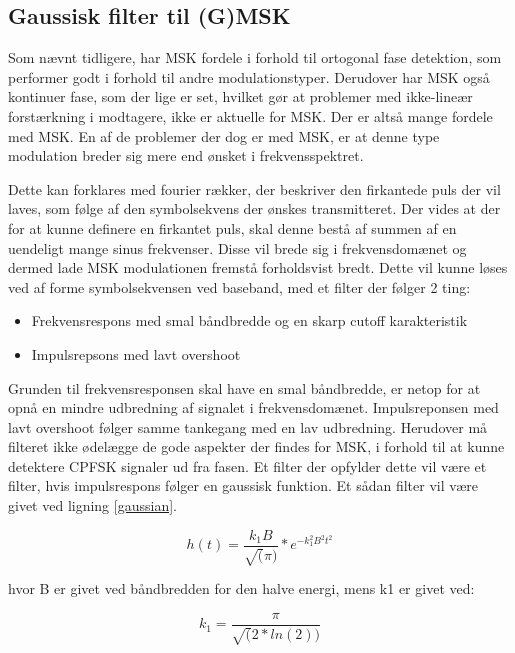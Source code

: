\begin{appendices}
\subsection{Gaussisk filter til (G)MSK} \label{gaussian_filter_heading}
Som nævnt tidligere, har MSK fordele i forhold til ortogonal fase detektion, som performer godt i forhold til andre modulationstyper. Derudover har MSK også kontinuer fase, som der lige er set, hvilket gør at problemer med ikke-lineær forstærkning i modtagere, ikke er aktuelle for MSK. Der er altså mange fordele med MSK. En af de problemer der dog er med MSK, er at denne type modulation breder sig mere end ønsket i frekvensspektret. 

Dette kan forklares med fourier rækker, der beskriver den firkantede puls der vil laves, som følge af den symbolsekvens der ønskes transmitteret. Der vides at der for at kunne definere en firkantet puls, skal denne bestå af summen af en uendeligt mange sinus frekvenser. Disse vil brede sig i frekvensdomænet og dermed lade MSK modulationen fremstå forholdsvist bredt. Dette vil kunne løses ved af forme symbolsekvensen ved baseband, med et filter der følger 2 ting:

\begin{itemize}
	\item Frekvensrespons med smal båndbredde og en skarp cutoff karakteristik
	\item Impulsrepsons med lavt overshoot
\end{itemize}

Grunden til frekvensresponsen skal have en smal båndbredde, er netop for at opnå en mindre udbredning af signalet i frekvensdomænet. Impulsreponsen med lavt overshoot følger samme tankegang med en lav udbredning. Herudover må filteret ikke ødelægge de gode aspekter der findes for MSK, i forhold til at kunne detektere CPFSK signaler ud fra fasen. Et filter der opfylder dette vil være et filter, hvis impulsrespons følger en gaussisk funktion. Et sådan filter vil være givet ved ligning \ref{gaussian}.

\begin{equation} \label{gaussian}
h(t) = \frac{k_1 B}{\sqrt(\pi)} * e^{-k_1^2 B^2 t^2}
\end{equation}

hvor B er givet ved båndbredden for den halve energi, mens k1 er givet ved: 

\begin{equation} \label{k1}
k_1 = \frac{\pi}{\sqrt(2 *ln(2))}
\end{equation}


\end{appendices}
